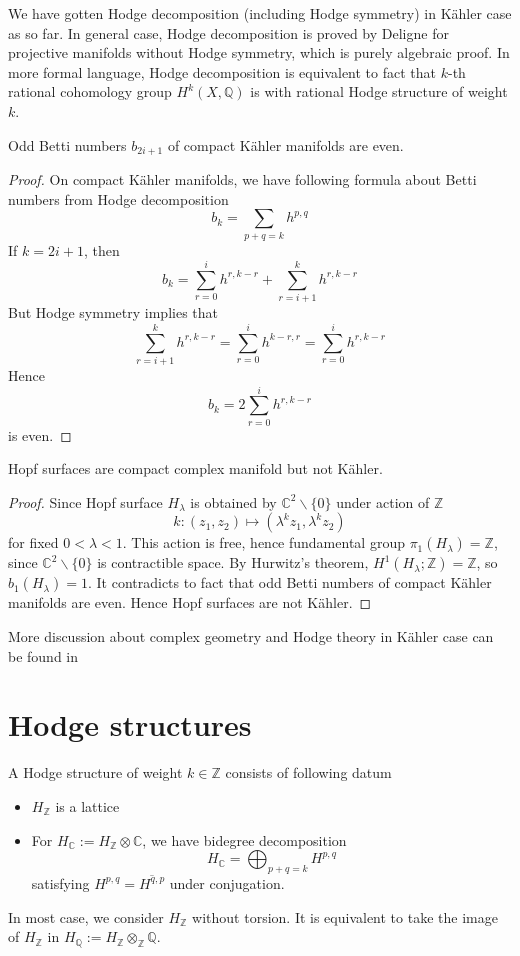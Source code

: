\documentclass[oneside,a4paper]{amsart}
\begin{document}
We have gotten Hodge decomposition (including Hodge symmetry) in K\"ahler case as so far. In general case, Hodge decomposition is proved by Deligne for projective manifolds without Hodge symmetry, which is purely algebraic proof. In more formal language, Hodge decomposition is equivalent to fact that $k$-th rational cohomology group $H^k(X, \mathbb{Q})$ is with rational Hodge structure of weight $k$.
\begin{secprop}
	Odd Betti numbers $b_{2i+1}$ of compact K\"ahler manifolds are even.
\end{secprop}
\begin{proof}
	On compact K\"ahler manifolds, we have following formula about Betti numbers from Hodge decomposition
	\begin{equation}
		b_{k}= \sum_{p+q=k}h^{p,q}
	\end{equation}
	If $k=2i+1$, then 
	\[
	b_{k}= \sum_{r=0}^{i}h^{r,k-r} + \sum_{r=i+1}^{k}h^{r,k-r}
	\]
	But Hodge symmetry implies that 
	\[
	\sum_{r=i+1}^{k}h^{r,k-r}= \sum_{r=0}^{i}h^{k-r,r} =\sum_{r=0}^{i}h^{r,k-r}
	\]
	Hence 
	\[
	b_k= 2\sum_{r=0}^{i}h^{r,k-r}
	\]
	is even.
\end{proof}

\begin{seccor}
	Hopf surfaces are compact complex manifold but not K\"ahler.
\end{seccor}
\begin{proof}
	Since Hopf surface $H_\lambda$ is obtained by $\mathbb{C}^2 \backslash\{0\}$ under action of $\mathbb{Z}$
	\[
	k : (z_1, z_2) \mapsto (\lambda^k z_1, \lambda^k z_2)
	\]
	for fixed $0 < \lambda <1$.
	This action is free, hence fundamental group $\pi_1(H_\lambda)= \mathbb{Z}$, since $\mathbb{C}^2\backslash\{0\}$ is contractible space. By Hurwitz's theorem, $H^1(H_\lambda;\mathbb{Z})= \mathbb{Z}$, so $b_1(H_\lambda)=1$. It contradicts to fact that odd Betti numbers of compact K\"ahler manifolds are even. Hence Hopf surfaces are not K\"ahler. 
\end{proof}

\begin{rem}
	More discussion about complex geometry and Hodge theory in K\"ahler case can be found in \cite{Huybrechts2004,Griffiths1994}
\end{rem}
\section{Hodge structures}
\begin{secdefn}
A Hodge structure of weight $k \in \mathbb{Z}$ consists of following datum
\begin{itemize}
\item $H_{\mathbb{Z}}$ is a lattice
\item For $H_{\mathbb{C}}:= H_{\mathbb{Z}} \otimes \mathbb{C}$, we have bidegree decomposition
\[
H_{\mathbb{C}}= \bigoplus_{p+q=k} H^{p,q}
\]
satisfying $H^{p,q}= \overline{H^{q,p}}$ under conjugation.
\end{itemize}
\end{secdefn}
In most case, we consider $H_{\mathbb{Z}}$ without torsion. It is equivalent to take the image of $H_{\mathbb{Z}}$ in $H_{\mathbb{Q}}:= H_{\mathbb{Z}}\otimes_{\mathbb{Z}} \mathbb{Q}$.
\end{document}
